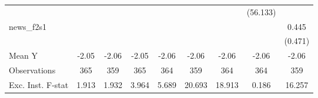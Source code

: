 {\begin{tabular}{l*{8}{c}}
            &                     &                     &                     &                     &                     &                     &    (56.133)         &                     \\
\addlinespace
news\_f2s1   &                     &                     &                     &                     &                     &                     &                     &       0.445         \\
            &                     &                     &                     &                     &                     &                     &                     &     (0.471)         \\
\midrule
Mean Y      &       -2.05         &       -2.06         &       -2.05         &       -2.06         &       -2.06         &       -2.06         &       -2.06         &       -2.06         \\
Observations&         365         &         359         &         365         &         364         &         359         &         364         &         364         &         359         \\
Exc. Inst. F-stat&       1.913         &       1.932         &       3.964         &       5.689         &      20.693         &      18.913         &       0.186         &      16.257         \\
\bottomrule
\end{tabular}
}
